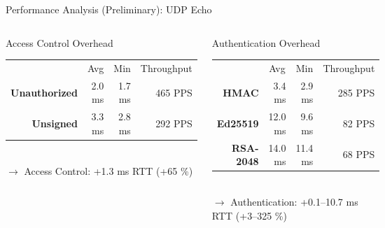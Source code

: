 \documentclass[en]{sdqbeamer}
\begin{document}
\begin{frame}{Performance Analysis (Preliminary): UDP Echo}
    \begin{columns}
        \begin{blueblock}{Access Control Overhead}
            \begin{tabular}{r r r r}
                & \multicolumn{1}{c}{Avg} & \multicolumn{1}{c}{Min} & \multicolumn{1}{c}{Throughput}\\
                \textbf{Unauthorized} & 2.0 ms & 1.7 ms & 465 PPS\\
                \textbf{Unsigned} & 3.3 ms & 2.8 ms & 292 PPS
            \end{tabular}
            \\$\rightarrow$ Access Control: +1.3 ms RTT (+65 \%)
        \end{blueblock}
        \begin{blueblock}{Authentication Overhead}
            \begin{tabular}{r r r r}
                & \multicolumn{1}{c}{Avg} & \multicolumn{1}{c}{Min} & \multicolumn{1}{c}{Throughput}\\
                \textbf{HMAC} & 3.4 ms & 2.9 ms & 285 PPS\\
                \textbf{Ed25519} & 12.0 ms & 9.6 ms & 82 PPS\\
                \textbf{RSA-2048} & 14.0 ms & 11.4 ms & 68 PPS
            \end{tabular}
            \\$\rightarrow$ Authentication: +0.1--10.7 ms RTT (+3--325 \%)
        \end{blueblock}
        \centering
        \includegraphics[height=0.72\textheight]{./figures/rtt-estimation-results.pdf}

\end{columns}
\end{frame}
\end{document}
